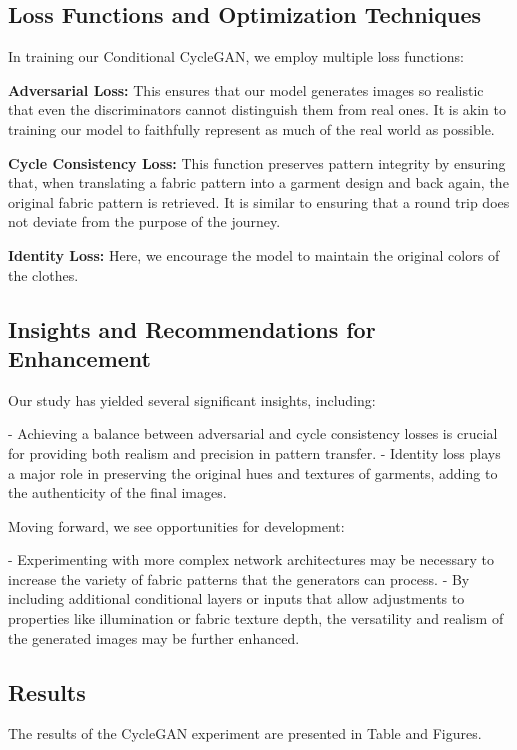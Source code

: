 \documentclass{article}
\begin{document}
\subsection{Loss Functions and Optimization Techniques}

In training our Conditional CycleGAN, we employ multiple loss functions:

\textbf{Adversarial Loss:} This ensures that our model generates images so realistic that even the discriminators cannot distinguish them from real ones. It is akin to training our model to faithfully represent as much of the real world as possible.

\textbf{Cycle Consistency Loss:} This function preserves pattern integrity by ensuring that, when translating a fabric pattern into a garment design and back again, the original fabric pattern is retrieved. It is similar to ensuring that a round trip does not deviate from the purpose of the journey.

\textbf{Identity Loss:} Here, we encourage the model to maintain the original colors of the clothes.

\subsection{Insights and Recommendations for Enhancement}

Our study has yielded several significant insights, including:

- Achieving a balance between adversarial and cycle consistency losses is crucial for providing both realism and precision in pattern transfer.
- Identity loss plays a major role in preserving the original hues and textures of garments, adding to the authenticity of the final images.

Moving forward, we see opportunities for development:

- Experimenting with more complex network architectures may be necessary to increase the variety of fabric patterns that the generators can process.
- By including additional conditional layers or inputs that allow adjustments to properties like illumination or fabric texture depth, the versatility and realism of the generated images may be further enhanced.


\subsection{Results}
The results of the CycleGAN experiment are presented in Table and Figures.
\end{document}
